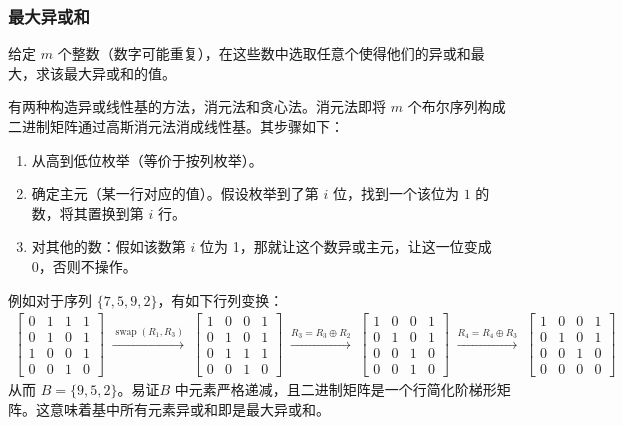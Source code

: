 \documentclass[12pt,a4paper]{article}
\begin{document}
\subsubsection{最大异或和}
\begin{mdframed}[leftline=true, linewidth=2pt, linecolor=gray]
	给定 $m$ 个整数（数字可能重复），在这些数中选取任意个使得他们的异或和最大，求该最大异或和的值。
\end{mdframed}
有两种构造异或线性基的方法，消元法和贪心法。消元法即将 $m$ 个布尔序列构成二进制矩阵通过高斯消元法消成线性基。其步骤如下：
\begin{enumerate}
	\item 从高到低位枚举（等价于按列枚举）。
	\item 确定主元（某一行对应的值）。假设枚举到了第 $i$ 位，找到一个该位为 $1$ 的数，将其置换到第 $i$ 行。
	\item 对其他的数：假如该数第 $i$ 位为 1，那就让这个数异或主元，让这一位变成 0，否则不操作。
\end{enumerate}
例如对于序列 $\{7,5,9,2\}$，有如下行列变换：
\begin{align*}
\begin{bmatrix}0 & 1 & 1 & 1 \\0 & 1 & 0 & 1 \\1 & 0 & 0 & 1 \\0 & 0 & 1 & 0\end{bmatrix}\;\xrightarrow{\operatorname{swap}(R_1,R_3)}\;\begin{bmatrix}1 & 0 & 0 & 1 \\0 & 1 & 0 & 1 \\0 & 1 & 1 & 1 \\0 & 0 & 1 & 0\end{bmatrix}\;\xrightarrow{R_3=R_3\oplus R_2}\;\begin{bmatrix}1 & 0 & 0 & 1 \\0 & 1 & 0 & 1 \\0 & 0 & 1 & 0 \\0 & 0 & 1 & 0\end{bmatrix}\;\xrightarrow{R_4=R_4\oplus R_3}\;\begin{bmatrix}1 & 0 & 0 & 1 \\0 & 1 & 0 & 1 \\0 & 0 & 1 & 0 \\0 & 0 & 0 & 0\end{bmatrix}
\end{align*}
从而 $B=\{9,5,2\}$。易证$B$ 中元素严格递减，且二进制矩阵是一个行简化阶梯形矩阵。这意味着基中所有元素异或和即是最大异或和。\\
\end{document}

